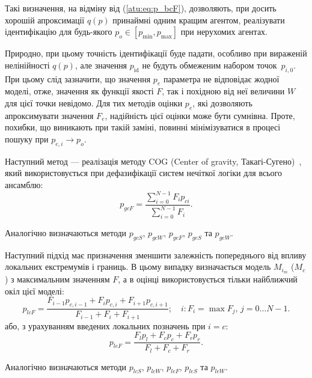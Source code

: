 Такі визначення, на відміну від (\ref{atu:eq:p_bcF}), дозволяють,
при досить хорошій апроксимації $q(p)$ принаймні одним кращим агентом,
реалізувати ідентифікацію для будь-якого
$p_o \in [p_{\min}, p_{\max}]$ при нерухомих агентах.

Природно, при цьому точність ідентифікації буде падати, особливо
при вираженій нелінійності
$q(p)$, але значення
$p_\mathrm{id}$ не будуть обмеженим набором точок~$p_{i,0}$.
При цьому слід зазначити, що значення
$p_e$ параметра не відповідає жодної моделі, отже, значення як
функції якості
$F$, так і похідною від неї величини
$W$ для цієї точки невідомо. Для тих методів оцінки
$p_e$, які дозволяють апроксимувати значення
$F_e$, надійність цієї оцінки може бути сумнівна. Проте, похибки,
що виникають при такій заміні, повинні мінімізуватися в процесі
пошуку при
$p_{e, i} \to p_o$.


Наступний метод --- реалізація методу
COG (Center of gravity, Такагі-Сугено)~\cite{atu_asau25,atu_csit2015,atu_asau16},
який використовується при дефазифікації систем нечіткої логіки для всього
ансамблю:
%
\begin{equation}
  p_{gcF}
  =
  \frac{\sum\limits_{i=0}^{N-1} F_{i} p_{ci}}
       {\sum\limits_{i=0}^{N-1} F_{i} }
  .
  \label{atu:eq:p_gcF}
\end{equation}

Аналогічно визначаються методи
$p_{gcS}$,
$p_{gcW}$,
$p_{geF}$,
$p_{geS}$ та
$p_{geW}$.


Наступний підхід має призначення зменшити залежність попереднього від впливу локальних
екстремумів і границь. В цьому випадку визначається модель $M_{i_{m}}$ ($M_{c}$) з
максимальним значенням $F$, а в оцінці використовується тільки найближчий
окіл цієї моделі:
%
\begin{equation}
  p_{lcF}
  =
  \frac{ F_{i-1} p_{c,i-1} + F_{i} p_{c,i} + F_{i+1} p_{c,i+1} }
       { F_{i-1}           + F_{i}         + F_{i+1}         }
  ;
  \quad
  i : F_i = \max{F_j}, \, j=0 \ldots N-1 .
  \label{atu:eq:p_lcF}
\end{equation}
%
або, з урахуванням введених локальних позначень при $i = c$:
%
\begin{equation}
  p_{leF}
  =
  \frac{ F_{l} p_{l} + F_{c} p_{c} + F_{r} p_{r} }
       { F_{l}       + F_{c}       + F_{r}       }
  .
  \label{atu:eq:p_lcFl}
\end{equation}

Аналогічно визначаються методи
$p_{lcS}$,
$p_{lcW}$,
$p_{leF}$,
$p_{leS}$ та
$p_{leW}$.

